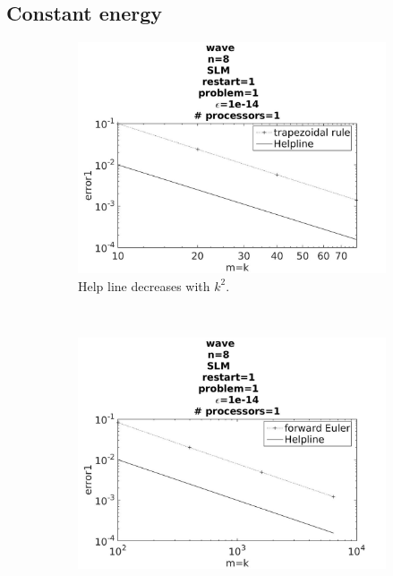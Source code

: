 \subsection{Constant energy}%
\begin{figure}[H]
        \centering
        \begin{subfigure}[b]{0.30\textwidth}
                \includegraphics[width=\textwidth]{../MATLAB/fig/intconvtrap.jpg}
                \caption{ Help line decreases with $k^2$. }
                \label{fig:intconvtrap}
        \end{subfigure}
        ~
        \begin{subfigure}[b]{0.30\textwidth}
                \includegraphics[width=\textwidth]{../MATLAB/fig/intconveul.jpg}

\end{subfigure}
\end{figure}
